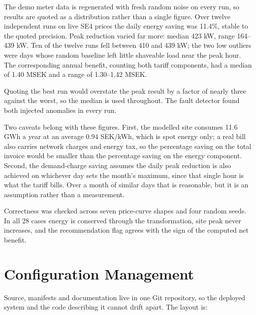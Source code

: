 \documentclass[conference]{IEEEtran}
\begin{document}
The demo meter data is regenerated with fresh random noise on every run, so
results are quoted as a distribution rather than a single figure. Over twelve
independent runs on live SE4 prices the daily energy saving was 11.4\%, stable
to the quoted precision. Peak reduction varied far more: median 423 kW, range
164--439 kW. Ten of the twelve runs fell between 410 and 439 kW; the two low
outliers were days whose random baseline left little shaveable load near the peak
hour. The corresponding annual benefit, counting both tariff components, had a
median of 1.40 MSEK and a range of 1.30--1.42 MSEK.

Quoting the best run would overstate the peak result by a factor of nearly three
against the worst, so the median is used throughout. The fault detector found
both injected anomalies in every run.

Two caveats belong with these figures. First, the modelled site consumes 11.6 GWh
a year at an average 0.94 SEK/kWh, which is spot energy only; a real bill also
carries network charges and energy tax, so the percentage saving on the total
invoice would be smaller than the percentage saving on the energy component.
Second, the demand-charge saving assumes the daily peak reduction is also
achieved on whichever day sets the month's maximum, since that single hour is
what the tariff bills. Over a month of similar days that is reasonable, but it is
an assumption rather than a measurement.

Correctness was checked across seven price-curve shapes and four random seeds.
In all 28 cases energy is conserved through the transformation, site peak never
increases, and the recommendation flag agrees with the sign of the computed net
benefit.

\section{Configuration Management}

Source, manifests and documentation live in one Git repository, so the deployed
system and the code describing it cannot drift apart. The layout is:
\end{document}
